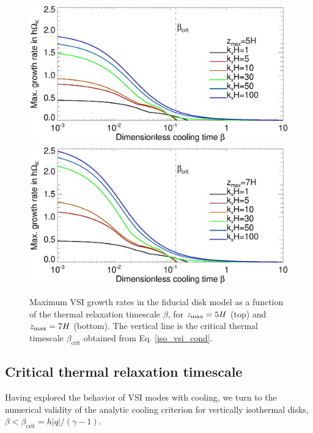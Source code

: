 \begin{figure}
  \includegraphics[width=\linewidth,clip=true,trim=0cm 1.75cm 0cm
  0.9cm]{figures/gcorr_compare_iso_maxrate_z5} 
  \includegraphics[width=\linewidth,clip=true,trim=0cm 0.0cm 0cm
  0.9cm]{figures/gcorr_compare_iso_maxrate_z7}  
  \caption{Maximum VSI growth rates in the fiducial disk 
     model as a function of the thermal relaxation timescale
     $\beta$, for %
     $z_\mathrm{max}=5H$ (top) and $z_\mathrm{max}=7H$ (bottom). The vertical line is the
     critical thermal timescale $\beta_\mathrm{crit}$ obtained  
     from Eq. \ref{iso_vsi_cond}. 
     \label{bcrit_compare1}}   
 \end{figure} 


\subsection{Critical thermal relaxation timescale}\label{bcrit_num_test}
Having explored the behavior of VSI modes with cooling, we turn to the numerical validity of the 
analytic cooling criterion for vertically isothermal disks, $\beta < \beta_\mathrm{crit} = h|q|/(\gamma -1)$.

